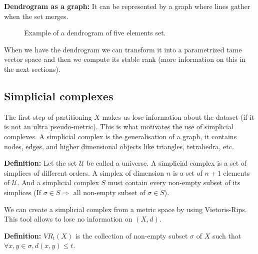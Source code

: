 \documentclass[11pt,a4paper]{article}
\begin{document}
\textbf{Dendrogram as a graph:}
It can be represented by a graph where lines gather when the set merges. 
 
\begin{figure}[H]
    \centering
    \caption{Example of a dendrogram of five elements set.}
    \label{fig:dendrogram}
\end{figure}

When we have the dendrogram we can transform it into a parametrized tame vector space and then we compute its stable rank (more information on this in the next sections).
 

\subsection{Simplicial complexes}
The first step of partitioning $X$ makes us lose information about the dataset (if it is not an ultra pseudo-metric). This is what motivates the use of simplicial complexes. A simplicial complex is the generalisation of a graph, it contains nodes, edges, and higher dimensional objects like triangles, tetrahedra, etc. 

\textbf{Definition:}
Let the set $\mathcal{U}$ be called a universe.
A simplicial complex is a set of simplices of different orders. A simplex of dimension $n$ is a set of $n+1$ elements of $\mathcal{U}$. And a simplicial complex $S$ must contain every non-empty subset of its simplices (If $\sigma \in S \Rightarrow$ all non-empty subset of $\sigma \in S$). 

We can create a simplicial complex from a metric space by using Vietoris-Rips. This tool allows to lose no information on $(X,d)$. 

\textbf{Definition:}
$VR_t(X)$ is the collection of non-empty subset $\sigma$ of $X$ such that $\forall x,y \in \sigma, d(x,y)\leq t$.
\end{document}
